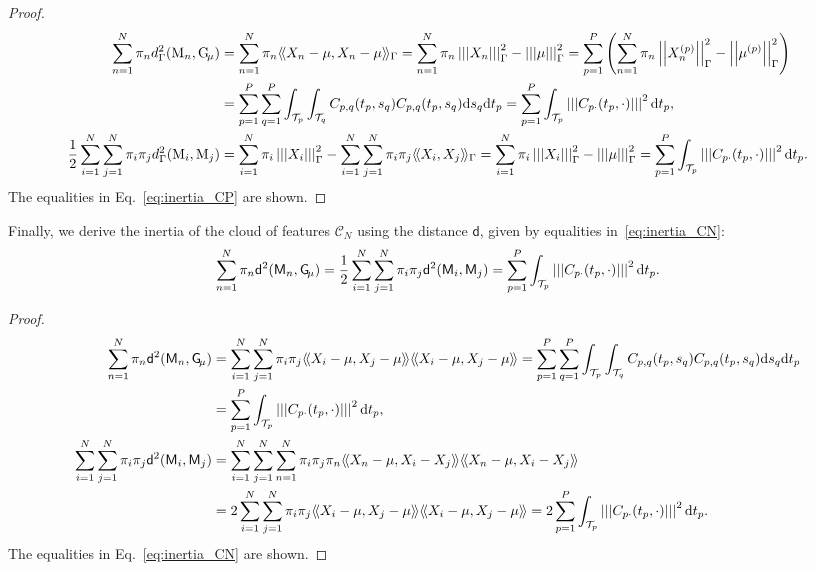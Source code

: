 \documentclass[times,sort&compress,3p]{elsarticle}
\theoremstyle{plain}%
\theoremstyle{definition}
\newcommand{\dd}{{\rm d}}
\newcommand{\TT}[1]{\mathcal{T}_{#1}} %
\newcommand{\normLp}[1]{\left|\left|#1\right|\right|} %
\newcommand{\inH}[2]{\langle\!\langle#1, #2\rangle\!\rangle}
\newcommand{\inHG}[2]{\langle\!\langle#1, #2\rangle\!\rangle_\Gamma}
\newcommand{\normH}[1]{\left|\left|\left|#1\right|\right|\right|}
\newcommand{\normHG}[1]{\left|\left|\left|#1\right|\right|\right|_\Gamma}
\newcommand{\Xnp}{X_n^{(p)}} %
\newcommand{\mup}[1]{\mu^{(#1)}} %
\newcommand{\pobs}[1]{\mathrm{#1}} %
\newcommand{\CN}{\mathcal{C}_{\!N}} %
\newcommand{\Gmu}{\pobs{G}_{\!\mu}} %
\newcommand{\pfea}[1]{\mathsf{#1}} %
\newcommand{\Gfea}{\pfea{G}_{\!\mu}} %
\begin{document}
\begin{proof}
\begin{align}
   \sum_{n = 1}^N \pi_n d_\Gamma^2(\pobs{M}_n, \Gmu)
   &= \sum_{n = 1}^N \pi_n \inHG{X_n - \mu}{X_n - \mu}
   = \sum_{n = 1}^N \pi_n \normHG{X_n}^2 - \normHG{\mu}^2
   = \sum_{p = 1}^P \left(\sum_{n = 1}^N \pi_n \normLp{\Xnp}_{\Gamma}^2 - \normLp{\mup{p}}_{\Gamma}^2\right) \\
   &= \sum_{p = 1}^P \sum_{q = 1}^P \int_{\TT{p}} \int_{\TT{q}} C_{p,q}(t_p, s_q)C_{p,q}(t_p, s_q) \dd s_q \dd t_p 
   = \sum_{p = 1}^P \int_{\TT{p}} \normH{C_{p \cdot}(t_p, \cdot)}^2 \dd t_p, \\
   \frac{1}{2}\sum_{i = 1}^N \sum_{j = 1}^N \pi_i \pi_j d_\Gamma^2(\pobs{M}_i, \pobs{M}_j)
   &= \sum_{i = 1}^N \pi_i \normHG{X_i}^2 - \sum_{i = 1}^N \sum_{j = 1}^N \pi_i\pi_j \inHG{X_i}{X_j}
    = \sum_{i = 1}^N \pi_i \normHG{X_i}^2 - \normHG{\mu}^2
    = \sum_{p = 1}^P \int_{\TT{p}} \normH{C_{p \cdot}(t_p, \cdot)}^2 \dd t_p. 
\end{align}
The equalities in Eq.~\eqref{eq:inertia_CP} are shown.
\end{proof}
Finally, we derive the inertia of the cloud of features $\CN$ using the distance $\mathsf{d}$, given by equalities in~\eqref{eq:inertia_CN}:
$$\sum_{n = 1}^N \pi_n \mathsf{d}^2(\pfea{M}_n, \Gfea) = \frac{1}{2}\sum_{i = 1}^N \sum_{j = 1}^N \pi_i \pi_j \mathsf{d}^2(\pfea{M}_i, \pfea{M}_j) = \sum_{p = 1}^P \int_{\TT{p}} \normH{C_{p \cdot}(t_p, \cdot)}^2 \dd t_p.$$

\begin{proof}
\begin{align}
\sum_{n = 1}^N \pi_n \mathsf{d}^2(\pfea{M}_n, \Gfea)
  &= \sum_{i = 1}^N \sum_{j = 1}^N \pi_i \pi_j \inH{X_i - \mu}{X_j - \mu}\inH{X_i - \mu}{X_j - \mu}
   = \sum_{p = 1}^P \sum_{q = 1}^P \int_{\TT{p}} \int_{\TT{q}} C_{p,q}(t_p, s_q)C_{p,q}(t_p, s_q) \dd s_q \dd t_p \\
  &= \sum_{p = 1}^P \int_{\TT{p}} \normH{C_{p \cdot}(t_p, \cdot)}^2 \dd t_p,\\
\sum_{i = 1}^N \sum_{j = 1}^N \pi_i \pi_j \mathsf{d}^2(\pfea{M}_i, \pfea{M}_j)
  &= \sum_{i = 1}^N \sum_{j = 1}^N \sum_{n = 1}^N \pi_i \pi_j \pi_n \inH{X_n - \mu}{X_i - X_j}\inH{X_n - \mu}{X_i - X_j} \\
  &= 2\sum_{i = 1}^N \sum_{j = 1}^N \pi_i \pi_j \inH{X_i - \mu}{X_j - \mu}\inH{X_i - \mu}{X_j - \mu}
   = 2\sum_{p = 1}^P \int_{\TT{p}} \normH{C_{p \cdot}(t_p, \cdot)}^2 \dd t_p.
\end{align}
The equalities in Eq.~\eqref{eq:inertia_CN} are shown.    
\end{proof}
\end{document}
